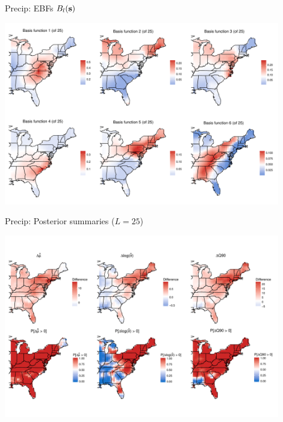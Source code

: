\documentclass{beamer}
\begin{document}
\begin{frame}{Precip: EBFs $B_l(\mathbf{s})$}
	\begin{center}
		\includegraphics[width=0.9\textwidth]{precip-ebf-panel}
	\end{center}
\end{frame}

\begin{frame}{Precip: Posterior summaries ($L = 25$)}
	\begin{center}
		\includegraphics[width=0.9\textwidth]{precip-ebf-postpanel-slides}
	\end{center}
\end{frame}
\end{document}
